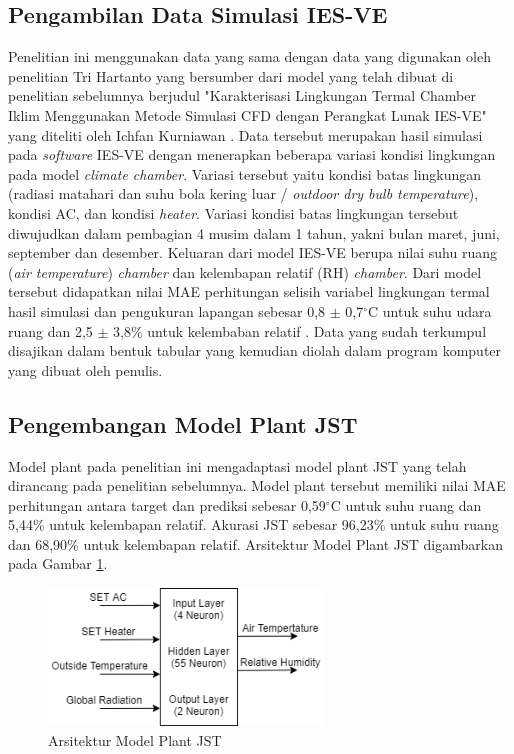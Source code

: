 \subsection{Pengambilan Data Simulasi IES-VE}
Penelitian ini menggunakan data yang sama dengan data yang digunakan oleh penelitian Tri Hartanto\cite{skripsiTanto} yang bersumber dari model yang telah dibuat di penelitian sebelumnya berjudul "Karakterisasi Lingkungan Termal Chamber Iklim Menggunakan Metode Simulasi CFD dengan Perangkat Lunak IES-VE" yang diteliti oleh Ichfan Kurniawan \cite{skripsiIchfan}.  Data tersebut merupakan hasil simulasi pada \textit{software} IES-VE dengan menerapkan beberapa variasi kondisi lingkungan pada model \textit{climate chamber}. Variasi tersebut yaitu kondisi batas lingkungan (radiasi matahari dan suhu bola kering luar / \textit{outdoor dry bulb temperature}), kondisi AC, dan kondisi \textit{heater}. Variasi kondisi batas lingkungan tersebut diwujudkan dalam pembagian 4 musim dalam 1 tahun, yakni bulan maret, juni, september dan desember. Keluaran dari model IES-VE berupa nilai suhu ruang (\textit{air temperature}) \textit{chamber} dan kelembapan relatif (RH) \textit{chamber}. Dari model tersebut didapatkan nilai MAE perhitungan selisih variabel lingkungan termal hasil simulasi dan pengukuran lapangan sebesar 0,8 $\pm$ 0,7$^{\circ}$C untuk suhu udara ruang dan 2,5 $\pm$ 3,8\% untuk kelembaban relatif \cite{skripsiIchfan}. Data yang sudah terkumpul disajikan dalam bentuk tabular yang kemudian diolah dalam program komputer yang dibuat oleh penulis.

\subsection{Pengembangan Model Plant JST}
Model plant pada penelitian ini mengadaptasi model plant JST yang telah dirancang pada penelitian sebelumnya\cite{skripsiTanto}. Model plant tersebut memiliki nilai MAE perhitungan antara target dan prediksi sebesar 0,59$^{\circ}$C untuk suhu ruang dan 5,44\% untuk kelembapan relatif. Akurasi JST sebesar 96,23\% untuk suhu ruang dan 68,90\% untuk kelembapan relatif. Arsitektur Model Plant JST digambarkan pada Gambar \ref{fig:4:NNPlantModelDesign}.

\begin{figure}[!h]
	\centering
	\includegraphics[width=0.65\textwidth]{figures/NNPlantModelDesign}
	\caption{Arsitektur Model Plant JST}
	\label{fig:4:NNPlantModelDesign}
\end{figure}

